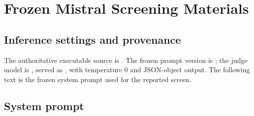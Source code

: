\chapter{Frozen Mistral Screening Materials}
\label{app:screening-materials}

\section{Inference settings and provenance}

The authoritative executable source is . The frozen prompt version is ; the judge model is , served as , with temperature 0 and JSON-object output. The following text is the frozen system prompt used for the reported screen.

\section{System prompt}

